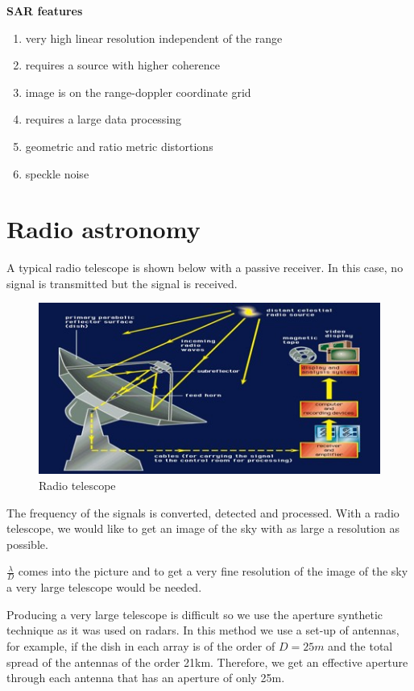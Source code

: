 \textbf{SAR features}
\begin{enumerate}
\itemsep0em
\item very high linear resolution independent of the range
\item requires a source with higher coherence
\item image is on the range-doppler coordinate grid
\item requires a large data processing
\item geometric and ratio metric distortions
\item speckle noise
\end{enumerate}

\section{Radio astronomy} 

A typical radio telescope is shown below with a passive receiver. In this case, no signal is transmitted but the signal is received.\\
\begin{figure}[h]
\centering
\includegraphics[scale=0.5]{./graphics/Radio-Telescope-0}
\caption{Radio telescope}
\end{figure}

The frequency of the signals is converted, detected and processed. With a radio telescope, we would like to get an image of the sky with as large a resolution as possible.

$\frac{\lambda}{D}$ comes into the picture and to get a very fine resolution of the image of the sky a very large telescope would be needed.

Producing a very large telescope is difficult so we use the aperture synthetic technique as it was used on radars. In this method we use a set-up of antennas, for example, if the dish in each array is of the order of $ D = 25m $ and the total spread of the antennas of the order 21km. Therefore, we get an effective aperture through each antenna that has an aperture of only 25m.

